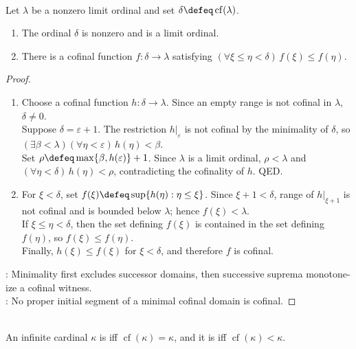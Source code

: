 \begin{lemma} \label{lem:nondecreasing-cofinal-witness} \\
Let $\lambda$ be a nonzero limit ordinal and set $\delta\defeq\operatorname{cf}(\lambda)$.
\begin{enumerate}[label=(\roman*)]
\setlength{\itemsep}{0pt}
\item The ordinal $\delta$ is nonzero and is a limit ordinal.
\item There is a cofinal function $f:\delta\to\lambda$ satisfying $(\forall\xi\leq\eta<\delta)\,f(\xi)\leq f(\eta)$.
\end{enumerate}
\begin{proof}
\begin{enumerate}[label=(\roman*)]
\setlength{\itemsep}{0pt}
\item Choose a cofinal function $h:\delta\to\lambda$. Since an empty range is not cofinal in $\lambda$, $\delta\neq0$.\\
Suppose $\delta=\varepsilon+1$. The restriction $h|_{\varepsilon}$ is not cofinal by the minimality of $\delta$, so $(\exists\beta<\lambda)(\forall\eta<\varepsilon)\,h(\eta)<\beta$.\\
Set $\rho\defeq\max\{\beta,h(\varepsilon)\}+1$. Since $\lambda$ is a limit ordinal, $\rho<\lambda$ and $(\forall\eta<\delta)\,h(\eta)<\rho$, contradicting the cofinality of $h$. QED.
\item For $\xi<\delta$, set $f(\xi)\defeq\sup\{h(\eta):\eta\leq\xi\}$. Since $\xi+1<\delta$, range of $h|_{\xi+1}$ is not cofinal and is bounded below $\lambda$; hence $f(\xi)<\lambda$.\\
If $\xi\leq\eta<\delta$, then the set defining $f(\xi)$ is contained in the set defining $f(\eta)$, so $f(\xi)\leq f(\eta)$.\\
Finally, $h(\xi)\leq f(\xi)$ for $\xi<\delta$, and therefore $f$ is cofinal.
\end{enumerate}
: Minimality first excludes successor domains, then successive suprema monotone-ize a cofinal witness.\\
: No proper initial segment of a minimal cofinal domain is cofinal.
\end{proof}
\end{lemma}

\begin{definition} \label{def:regular-and-singular-cardinals} \\
An infinite cardinal $\kappa$ is  iff $\operatorname{cf}(\kappa)=\kappa$, and it is  iff $\operatorname{cf}(\kappa)<\kappa$.
\end{definition}

